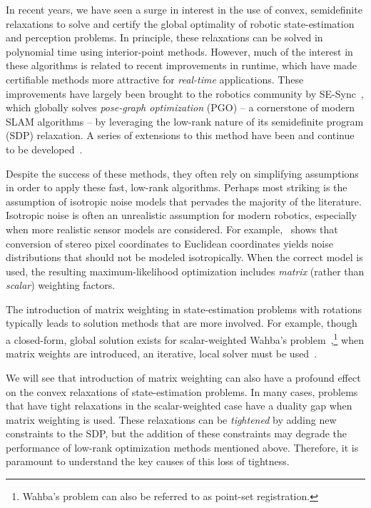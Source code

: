 \documentclass[lettersize,journal]{IEEEtran}
\begin{document}
In recent years, we have seen a surge in interest in the use of convex, semidefinite relaxations to solve and certify the global optimality of robotic state-estimation and perception problems. 
In principle, these relaxations can be solved in polynomial time using interior-point methods\cite{vandenbergheSemidefiniteProgramming1996}. However, much of the interest in these algorithms is related to recent improvements in runtime, which have made certifiable methods more attractive for \emph{real-time} applications. These improvements have largely been brought to the robotics community by SE-Sync~\cite{rosenSESyncCertifiablyCorrect2019}, which globally solves \emph{pose-graph optimization} (PGO) -- a cornerstone of modern SLAM algorithms -- by leveraging the low-rank nature of its semidefinite program (SDP) relaxation. A series of extensions to this method have been and continue to be developed~\cite{rosenAdvancesInferenceRepresentation2021}.

Despite the success of these methods, they often rely on simplifying assumptions in order to apply these fast, low-rank algorithms. Perhaps most striking is the assumption of isotropic noise models that pervades the majority of the literature. Isotropic noise is often an unrealistic assumption for modern robotics, especially when more realistic sensor models are considered. For example,~\cite{matthiesErrorModelingStereo1987} shows that conversion of stereo pixel coordinates to Euclidean coordinates yields noise distributions that should not be modeled isotropically. When the correct model is used, the resulting maximum-likelihood optimization includes \emph{matrix} (rather than \emph{scalar}) weighting factors. 

The introduction of matrix weighting in state-estimation problems with rotations typically leads to solution methods that are more involved. For example, though a closed-form, global solution exists for scalar-weighted Wahba's problem~\cite{hornClosedformSolutionAbsolute1987, hornClosedFormSolutionAbsolute1988, wahbaLeastSquaresEstimate1965},\footnote{Wahba's problem can also be referred to as point-set registration.} when matrix weights are introduced, an iterative, local solver must be used~\cite{chengTotalLeastSquaresEstimate2019, barfootStateEstimationRobotics2017}. %

We will see that introduction of matrix weighting can also have a profound effect on the convex relaxations of state-estimation problems. In many cases, problems that have tight relaxations in the scalar-weighted case have a duality gap when matrix weighting is used. These relaxations can be \emph{tightened} by adding new constraints to the SDP, but the addition of these constraints may degrade the performance of  low-rank optimization methods mentioned above. Therefore, it is paramount to understand the key causes of this loss of tightness.
\end{document}
